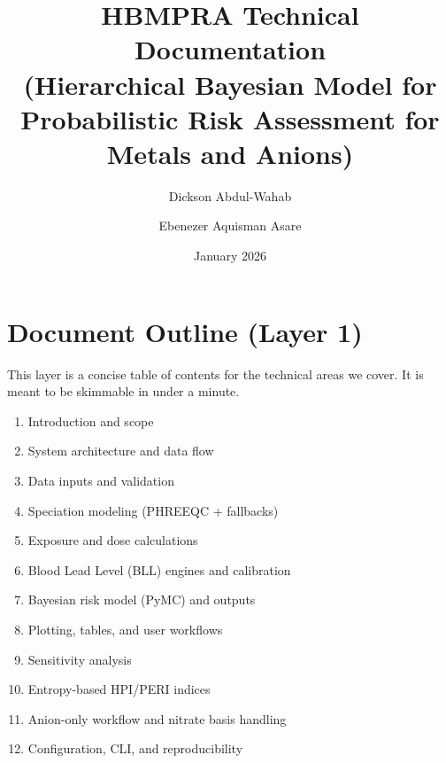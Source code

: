 \documentclass[11pt,a4paper]{article}
\title{HBMPRA Technical Documentation\\(Hierarchical Bayesian Model for Probabilistic Risk Assessment for Metals and Anions)}
\author{Dickson Abdul-Wahab \and Ebenezer Aquisman Asare}
\date{January 2026}
\begin{document}
\maketitle
\tableofcontents
\clearpage

\section*{Document Outline (Layer 1)}
This layer is a concise table of contents for the technical areas we cover. It is meant to be skimmable in under a minute.
\begin{enumerate}[label=\textbf{O\arabic*}.]
  \item Introduction and scope
  \item System architecture and data flow
  \item Data inputs and validation
  \item Speciation modeling (PHREEQC + fallbacks)
  \item Exposure and dose calculations
  \item Blood Lead Level (BLL) engines and calibration
  \item Bayesian risk model (PyMC) and outputs
  \item Plotting, tables, and user workflows
  \item Sensitivity analysis
  \item Entropy-based HPI/PERI indices
  \item Anion-only workflow and nitrate basis handling
  \item Configuration, CLI, and reproducibility
\end{enumerate}
\clearpage

\end{document}
